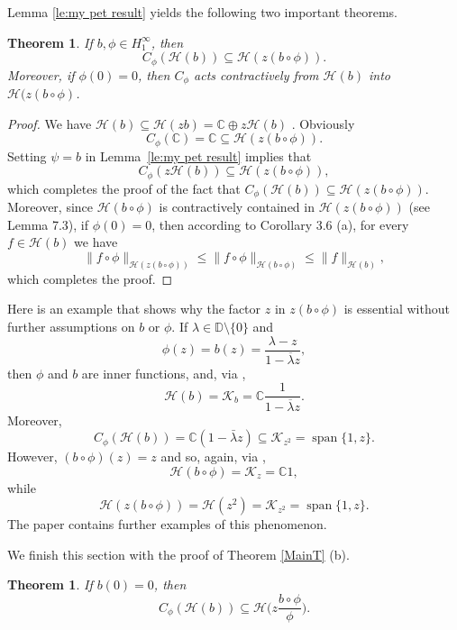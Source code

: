 \documentclass[11pt]{amsart}
\def\C{{\mathbb{C}}}
\def\D{\mathbb{D}}
\def\HH{{\mathcal H}}
\renewcommand{\leq}{\leqslant}
\renewcommand{\subset}{\subseteq}
\numberwithin{equation}{section}
\theoremstyle{plain}
\newtheorem{theorem}[equation]{Theorem}
\theoremstyle{definition}
\begin{document}
Lemma \ref{le:my pet result} yields the following two important theorems.

\begin{theorem}\label{th:the general result}
	If $b,\phi\in H^\infty_1$, then
	\[
	C_\phi(\HH(b))\subset \HH(z(b\circ\phi)).
	\]
    Moreover, if $\phi(0)=0$, then $C_\phi$ acts contractively from $\HH(b)$ into $\HH(z(b\circ \phi)$.
\end{theorem}

\begin{proof}
	We have $\HH(b)\subset\HH(zb)=\C\oplus z\HH(b)$ \cite[Thm.~18.8]{Hb2-book}.  Obviously $$C_\phi(\C)=\C\subset \HH(z(b\circ\phi)).$$ Setting $\psi = b$ in Lemma~\ref{le:my pet result} implies that $$C_\phi(z\HH(b))\subset \HH(z(b\circ\phi)),$$ which completes the proof of the fact that $C_\phi(\HH(b))\subset \HH(z(b\circ\phi))$. Moreover, since $\HH(b\circ\phi)$ is contractively contained in $\HH(z(b\circ\phi))$ (see Lemma 7.3), if $\phi(0)=0$, then according to Corollary 3.6 (a), for every $f\in\HH(b)$ we have 
\[ 
\|f\circ\phi\|_{\HH(z(b\circ\phi))}\leq \|f\circ\phi\|_{\HH(b\circ\phi)}\leq \|f\|_{\HH(b)},
\]
which completes the proof. 
\end{proof}

Here is an example that shows why the factor $z$ in $z (b \circ \phi)$ is essential without further assumptions on $b$ or $\phi$. 
If $\lambda \in \D \setminus \{0\}$ and 
$$\phi(z) = b(z) = \frac{\lambda - z}{1 - \overline{\lambda} z},$$
then $\phi$ and $b$ are inner functions, and, via \cite[p.~116]{MR3526203},
$$\HH(b) = \mathcal{K}_b = \C \frac{1}{1 - \overline{\lambda} z}.$$
Moreover, 
$$C_{\phi}(\HH(b)) = \C (1 - \bar \lambda z) \subset  \mathcal{K}_{z^2} = \operatorname{span}\{1, z\}.$$
However, $(b \circ \phi)(z) = z$ and so, again, via \cite[p.~116]{MR3526203},
$$\HH(b \circ \phi) = \mathcal{K}_z = \C 1,$$
while 
$$\HH(z (b \circ \phi)) = \HH(z^2) = \mathcal{K}_{z^2} = \operatorname{span}\{1, z\}.$$
 The paper \cite{MR3176147} contains further examples of this phenomenon. 

 We finish this section with the proof of Theorem \ref{MainT} (b).

\begin{theorem}\label{th:b(0)0}
	If $b(0)=0$, then 
	\begin{equation}\label{eq:b(0)=0}
		C_\phi(\HH(b))\subset \HH \Big(z\frac{b\circ\phi}{\phi}\Big).
	\end{equation}

\end{theorem}
\end{document}

